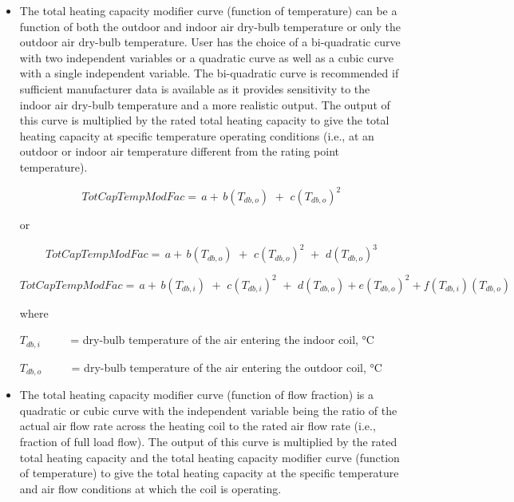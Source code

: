 \begin{itemize}
  \item
The total heating capacity modifier curve (function of temperature) can be a function of both the outdoor and indoor air dry-bulb temperature or only the outdoor air dry-bulb temperature. User has the choice of a bi-quadratic curve with two independent variables or a quadratic curve as well as a cubic curve with a single independent variable. The bi-quadratic curve is recommended if sufficient manufacturer data is available as it provides sensitivity to the indoor air dry-bulb temperature and a more realistic output. The output of this curve is multiplied by the rated total heating capacity to give the total heating capacity at specific temperature operating conditions (i.e., at an outdoor or indoor air temperature different from the rating point temperature).

\begin{equation}
TotCapTempModFac = \,a + \,b\left( {{T_{db,o}}} \right)\,\, + \,\,c{\left( {{T_{db,o}}} \right)^2}
\end{equation}

or

\begin{equation}
TotCapTempModFac = \,a + \,b\left( {{T_{db,o}}} \right)\,\, + \,\,c{\left( {{T_{db,o}}} \right)^2}\,\, + \,\,d{\left( {{T_{db,o}}} \right)^3}
\end{equation}

\begin{equation}
TotCapTempModFac = \,a + \,b\left( {{T_{db,i}}} \right)\,\, + \,\,c{\left( {{T_{db,i}}} \right)^2}\,\, + \,\,d\left( {{T_{db,o}}} \right) + e{\left( {{T_{db,o}}} \right)^2} + f\left( {{T_{db,i}}} \right)\left( {{T_{db,o}}} \right)
\end{equation}

where

\({T_{db,i}}\) ~~~~ = dry-bulb temperature of the air entering the indoor coil, °C

\({T_{db,o}}\) ~~~~ = dry-bulb temperature of the air entering the outdoor coil, °C

  \item
The total heating capacity modifier curve (function of flow fraction) is a quadratic or cubic curve with the independent variable being the ratio of the actual air flow rate across the heating coil to the rated air flow rate (i.e., fraction of full load flow). The output of this curve is multiplied by the rated total heating capacity and the total heating capacity modifier curve (function of temperature) to give the total heating capacity at the specific temperature and air flow conditions at which the coil is operating.


\end{itemize}
